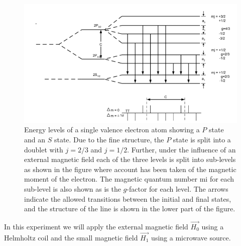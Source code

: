 \documentclass[%
 reprint,
nofootinbib,
 amsmath,amssymb,
 aps,
floatfix,
]{revtex4-2}
\begin{document}
    \begin{figure}
        \centering
        \includegraphics[scale = 1]{Figures/energylevels.png}
        \caption{Energy levels of a single valence electron atom showing a $P$ state and an $S$ state. Due to the fine structure, the $P$ state is split into a doublet with $j=2/3$ and $j = 1/2$. Further, under the influence of an external magnetic field each of the three levels is split into sub-levels as shown in the figure where account has been taken of the magnetic moment of the electron. The magnetic quantum number mi for each sub-level is also shown as is the $g$-factor for each level. The arrows indicate the allowed transitions between the initial and final states, and the structure of the line is shown in the lower part of the figure.}
        \label{fig:energylevels}
    \end{figure}
    \par
    In this experiment we will apply the external magnetic field $\Vec{H_0}$ using a Helmholtz coil and the small magnetic field $\Vec{H_1}$ using a microwave source.
\end{document}
